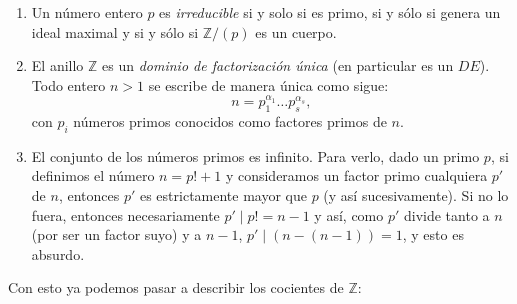 \documentclass[12pt]{article}
\begin{document}
\begin{enumerate}
\item Un número entero $p$ es \textit{irreducible} si y solo si es primo, si y sólo si genera un ideal maximal y si y sólo si $\mathbb{Z}/(p)$ es un cuerpo.
\item El anillo $\mathbb{Z}$ es un \textit{dominio de factorización única} (en particular es un $DE$). Todo entero $n >1$ se escribe de manera única como sigue: $$n = p_{1}^{\alpha_{1}} \ldots p_{s}^{\alpha_{s}},$$ con $p_{i}$ números primos conocidos como factores primos de $n$.
\item El conjunto de los números primos es infinito. Para verlo, dado un primo $p$, si definimos el número $n = p!+1$ y consideramos un factor primo cualquiera $p'$ de $n$, entonces $p'$ es estrictamente mayor que $p$ (y así sucesivamente). Si no lo fuera, entonces necesariamente $p' \mid p! = n-1$ y así, como $p'$ divide tanto a $n$ (por ser un factor suyo) y a $n-1$, $p' \mid (n-(n-1)) = 1$, y esto es absurdo.
\end{enumerate}

Con esto ya podemos pasar a describir los cocientes de $\mathbb{Z}$:
\end{document}
